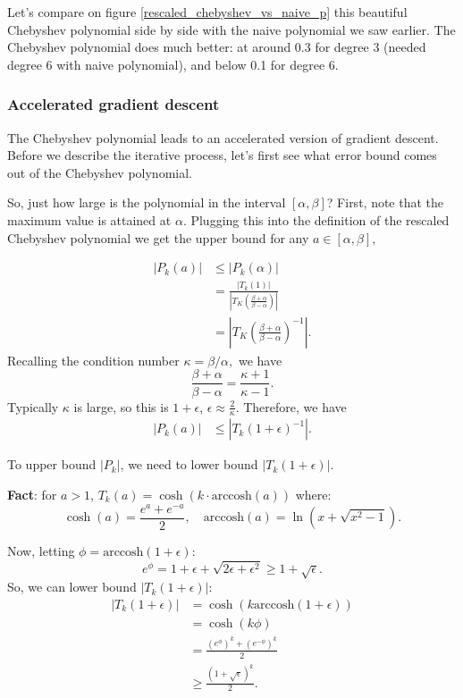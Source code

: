 Let's compare on figure \ref{rescaled_chebyshev_vs_naive_p} this beautiful Chebyshev polynomial side by side with the naive polynomial we saw earlier. The Chebyshev polynomial does much better: at around 0.3 for degree 3 (needed degree 6 with naive polynomial), and below 0.1 for degree 6.



\subsubsection{Accelerated gradient descent}

The Chebyshev polynomial leads to an accelerated version of gradient descent. Before we describe the iterative process, let's first see what error bound comes out of the Chebyshev polynomial.

So, just how large is the polynomial in the interval $[\alpha, \beta]$? First, note that the maximum value is attained at $\alpha$. Plugging this into the definition of the rescaled Chebyshev polynomial we get the upper bound for any $a\in[\alpha, \beta],$

\begin{align*}
|P_k(a)| &\leq |P_k(\alpha)| \\
&= \frac{|T_k(1)|}{|T_K\left(\frac{\beta + \alpha}{\beta - \alpha}\right)|} \\
&= {|T_K\left(\frac{\beta + \alpha}{\beta - \alpha}\right)^{-1}|}.
\end{align*}
Recalling the condition number $\kappa=\beta/\alpha,$ we have
\begin{equation*}
\frac{\beta + \alpha}{\beta - \alpha} = \frac{\kappa + 1}{\kappa - 1}.
\end{equation*}
Typically $\kappa$ is large, so this is $1 + \epsilon$, $\epsilon \approx \frac{2}{\kappa}$. Therefore, we have
\begin{eqnarray*}
|P_k(a)| &\leq {|T_k(1 + \epsilon)^{-1}|}.
\end{eqnarray*}

To upper bound $|P_k|$, we need to lower bound $|T_k(1 + \epsilon)|$.

\textbf{Fact}: for $a > 1$, $T_k(a) = \cosh\left(k \cdot \mathrm{arccosh} (a)\right)$ where:
\begin{equation*}
\cosh(a) = \frac{e^a + e^{-a}}{2},\quad \mathrm{arccosh}(a) = \ln\left(x + \sqrt{x^2 - 1}\right).
\end{equation*}

Now, letting $\phi = \mathrm{arccosh}(1 + \epsilon)$:
\begin{equation*}
e^{\phi} = 1 + \epsilon + \sqrt{2\epsilon + \epsilon^2} \geq 1 + \sqrt{\epsilon}.
\end{equation*}
So, we can lower bound $|T_k(1 + \epsilon)|$:
\begin{align*}
|T_k(1 + \epsilon)| &= \cosh\left(k \mathrm{arccosh}(1 + \epsilon)\right) \\
&= \cosh(k\phi) \\
&= \frac{(e^\phi)^k + (e^{-\phi})^k}{2} \\
&\geq \frac{(1 + \sqrt{\epsilon})^k}{2}.
\end{align*}

